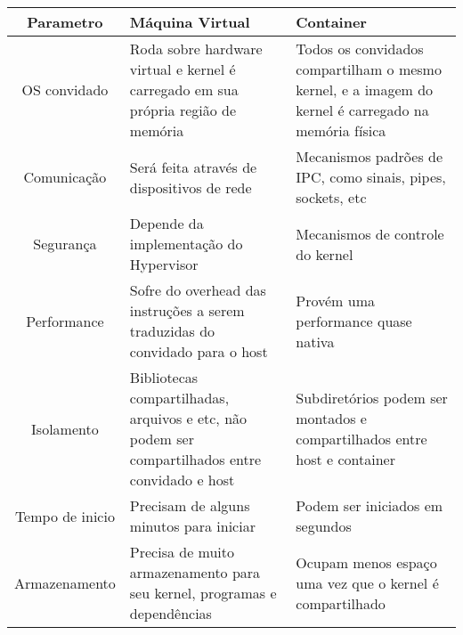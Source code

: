 \begin{tabular}{|c|p{5cm}|p{5cm}|}
\hline
\textbf{Parametro} & \textbf{Máquina Virtual} & \textbf{Container} \\
\hline
OS convidado    & Roda sobre hardware virtual e kernel é carregado em sua própria região de memória & Todos os convidados compartilham o mesmo kernel, e a imagem do kernel é carregado na memória física \\
\hline
Comunicação     & Será feita através de dispositivos de rede & Mecanismos padrões de IPC, como sinais, pipes, sockets, etc \\
\hline
Segurança       & Depende da implementação do Hypervisor & Mecanismos de controle do kernel \\
\hline
Performance     & Sofre do overhead das instruções a serem traduzidas do convidado para o host & Provém uma performance quase nativa \\
\hline
Isolamento      & Bibliotecas compartilhadas, arquivos e etc, não podem ser compartilhados entre convidado e host & Subdiretórios podem ser montados e compartilhados entre host e container \\
\hline
Tempo de inicio & Precisam de alguns minutos para iniciar  &  Podem ser iniciados em segundos \\
\hline
Armazenamento  & Precisa de muito armazenamento para seu kernel, programas e dependências &  Ocupam menos espaço uma vez que o kernel é compartilhado \\
\hline
\end{tabular}
